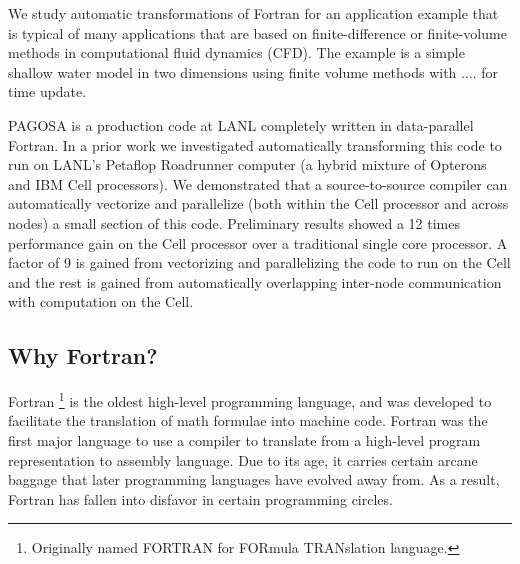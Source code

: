 \documentclass[10pt, conference, compsocconf]{IEEEtran}
\begin{document}


We study automatic transformations of Fortran for an application example that
is typical of many applications that are based on finite-difference or
finite-volume methods in computational fluid dynamics (CFD).  The example is a
simple shallow water model in two dimensions using finite volume methods with
.... for time update.

PAGOSA is a production code at LANL completely written in data-parallel
Fortran.  In a prior work we investigated automatically transforming this code
to run on LANL's Petaflop Roadrunner computer (a hybrid mixture of Opterons
and IBM Cell processors).  We demonstrated that a source-to-source compiler
can automatically vectorize and parallelize (both within the Cell processor
and across nodes) a small section of this code.  Preliminary results showed a
12 times performance gain on the Cell processor over a traditional single core
processor.  A factor of 9 is gained from vectorizing and parallelizing the
code to run on the Cell and the rest is gained from automatically overlapping
inter-node communication with computation on the Cell.

\subsection{Why Fortran?}

Fortran \footnote{Originally named FORTRAN for FORmula TRANslation language.}
is the oldest high-level programming language, and was developed to facilitate
the translation of math formulae into machine code. Fortran was the first
major language to use a compiler to translate from a high-level program
representation to assembly language. Due to its age, it carries certain arcane
baggage that later programming languages have evolved away from. As a result,
Fortran has fallen into disfavor in certain programming circles.
\end{document}
